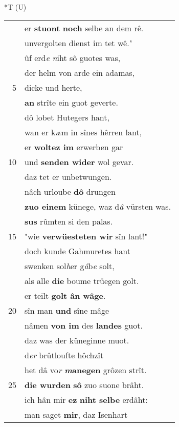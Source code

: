 \documentclass[8pt,a4paper,notitlepage]{article}
\begin{document}
\begin{table}[ht]
\begin{minipage}[t]{0.5\linewidth}
\end{minipage}
\hspace{0.5cm}
\begin{minipage}[t]{0.5\linewidth}
\small
\begin{center}*T (U)
\end{center}
\begin{tabular}{rl}
 & er \textbf{stuont} \textbf{noch} selbe an dem rê.\\ 
 & unvergolten dienst im tet wê."\\ 
 & ûf erd\textit{e n}iht sô guotes was,\\ 
 & der helm von arde ein adamas,\\ 
5 & dicke und herte,\\ 
 & \textbf{an} strîte ein guot geverte.\\ 
 & dô lobet Hutegers hant,\\ 
 & wan er k\textit{æ}m in sînes hêrren lant,\\ 
 & er \textbf{woltez im} erwerben gar\\ 
10 & und \textbf{senden wider} wol gevar.\\ 
 & daz tet er unbetwungen.\\ 
 & nâch urloube \textbf{dô} drungen\\ 
 & \textbf{zuo einem} künege, waz d\textit{â} vürsten was.\\ 
 & \textbf{sus} rûmten si den palas.\\ 
15 & "wie \textbf{verwüesteten wir} sîn lant!"\\ 
 & doch kunde Gahmuretes hant\\ 
 & swenken sol\textit{h}er g\textit{â}b\textit{e} solt,\\ 
 & als alle \textbf{die} boume trüegen golt.\\ 
 & er teilt \textbf{golt ân wâge}.\\ 
20 & sîn man \textbf{und} sîne mâge\\ 
 & nâmen \textbf{von im} des \textbf{landes} guot.\\ 
 & daz was der küneginne muot.\\ 
 & d\textit{er} brûtloufte hôchzît\\ 
 & het dâ vo\textit{r} \textbf{\textit{m}anegen} grôzen strît.\\ 
25 & \textbf{die wurden} \textbf{sô} zuo suone brâht.\\ 
 & ich hân mir \textbf{ez} \textbf{niht selbe} erdâht:\\ 
 & man saget \textbf{mir}, daz Isenhart\\ 

\end{tabular}
\end{minipage}
\end{table}
\end{document}
